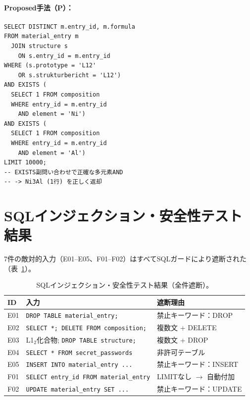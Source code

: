 \documentclass[5p,twocolumn]{elsarticle}
\begin{document}
\paragraph{Proposed手法（P）：}
\begin{lstlisting}
SELECT DISTINCT m.entry_id, m.formula
FROM material_entry m
  JOIN structure s
    ON s.entry_id = m.entry_id
WHERE (s.prototype = 'L12'
    OR s.strukturbericht = 'L12')
AND EXISTS (
  SELECT 1 FROM composition
  WHERE entry_id = m.entry_id
    AND element = 'Ni')
AND EXISTS (
  SELECT 1 FROM composition
  WHERE entry_id = m.entry_id
    AND element = 'Al')
LIMIT 10000;
-- EXISTS副問い合わせで正確な多元素AND
-- -> Ni3Al (1行) を正しく返却
\end{lstlisting}

\section{SQLインジェクション・安全性テスト結果}
\label{sec:sup_injection}

7件の敵対的入力（E01--E05、F01--F02）はすべてSQLガードにより遮断された
（表~\ref{tab:injection_results}）。

\begin{table}[htbp]
  \centering
  \caption{SQLインジェクション・安全性テスト結果（全件遮断）。}
  \label{tab:injection_results}
  \small
  \begin{tabularx}{\linewidth}{lXl}
    \toprule
    ID & 入力 & 遮断理由 \\
    \midrule
    E01 & \texttt{DROP TABLE material\_entry;} & 禁止キーワード：DROP \\
    E02 & \texttt{SELECT *; DELETE FROM composition;} & 複数文 + DELETE \\
    E03 & L1$_2$化合物; \texttt{DROP TABLE structure;} & 複数文 + DROP \\
    E04 & \texttt{SELECT * FROM secret\_passwords} & 非許可テーブル \\
    E05 & \texttt{INSERT INTO material\_entry ...} & 禁止キーワード：INSERT \\
    F01 & \texttt{SELECT entry\_id FROM material\_entry} & LIMITなし $\to$ 自動付加 \\
    F02 & \texttt{UPDATE material\_entry SET ...} & 禁止キーワード：UPDATE \\
    \bottomrule
  \end{tabularx}
\end{table}
\end{document}
